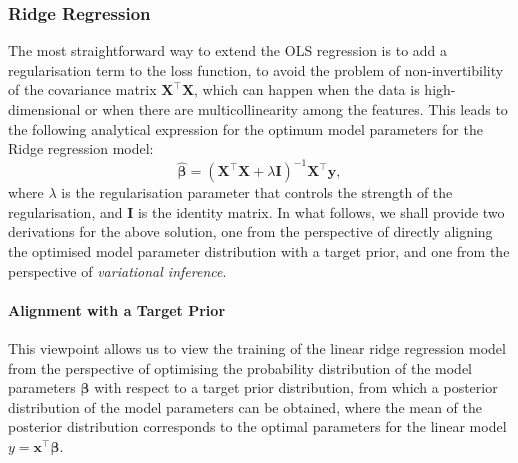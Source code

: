 \subsubsection{Ridge Regression}\label{appendix:ridge_regression}
The most straightforward way to extend the OLS regression is to add a regularisation term to the loss function, to avoid the problem of non-invertibility of the covariance matrix $\bm{X}^\top\bm{X}$, which can happen when the data is high-dimensional or when there are multicollinearity among the features. This leads to the following analytical expression for the optimum model parameters for the Ridge regression model:
\begin{equation}
    \label{eq:ridge_solution}
    \hat{\boldsymbol{\beta}}=(\bm{X}^\top\bm{X}+\lambda \bm{I})^{-1}\bm{X}^\top\bm{y},
\end{equation}  
where $\lambda$ is the regularisation parameter that controls the strength of the regularisation, and $\bm{I}$ is the identity matrix. In what follows, we shall provide two derivations for the above solution, one from the perspective of directly aligning the optimised model parameter distribution with a target prior, and one from the perspective of \emph{variational inference}.\cite{blei2017variational}

\paragraph{Alignment with a Target Prior}
This viewpoint allows us to view the training of the linear ridge regression model from the perspective of optimising the probability distribution of the model parameters $\boldsymbol{\beta}$ with respect to a target prior distribution, from which a posterior distribution of the model parameters can be obtained, where the mean of the posterior distribution corresponds to the optimal  parameters for the linear model $y=\bm{x}^\top\boldsymbol{\beta}$. 


